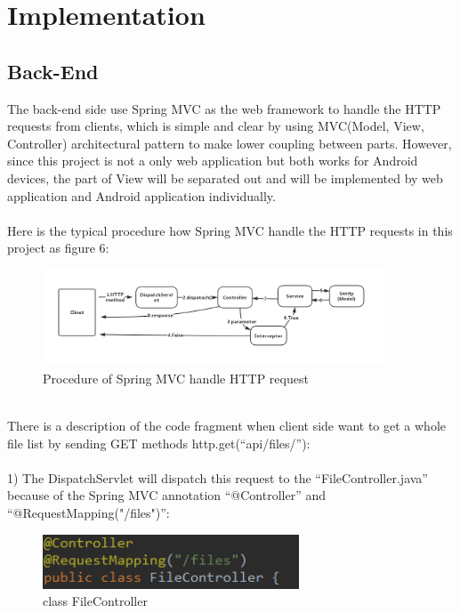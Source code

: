 \documentclass[12pt,a4]{article}
\begin{document}
\section{Implementation}\label{4}
\subsection{Back-End}\label{4.1}
The back-end side use Spring MVC as the web framework to handle the HTTP requests from clients, which is simple and clear by using MVC(Model, View, Controller) architectural pattern to make lower coupling between parts. However, since this project is not a only web application but both works for Android devices, the part of View will be separated out and will be implemented by web application and Android application individually.\\
\\
Here is the typical procedure how Spring MVC handle the HTTP requests in this project as figure 6:
\begin{figure}[h]%
		\centering  %
		\includegraphics[width=4in]{figure/5}  	%
		\caption{Procedure of Spring MVC handle HTTP request}   %
		\end{figure}
\\
There is a description of the code fragment when client side want to get a whole file list by sending GET methods http.get(“api/files/”):
\\
\\
1) The DispatchServlet will dispatch this request to the “FileController.java” because of the Spring MVC annotation “@Controller” and “@RequestMapping("/files")”:
\begin{figure}[h]%
		\centering  %
		\includegraphics[width=3in]{figure/first}  	%
		\caption{class FileController}   %
		\end{figure}
	\\
\end{document}
